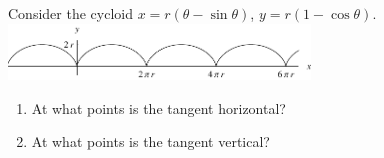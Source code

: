 \begin{frame}[t]
\begin{example} %
Consider the cycloid $x = r(\theta - \sin \theta )$, $y = r(1 - \cos \theta )$.
\ \includegraphics[height=1.5cm]{parametric-curves/pictures/11-02-ex2a.pdf}%
\begin{enumerate}
\item  At what points is the tangent horizontal?
\item  At what points is the tangent vertical?
\end{enumerate}
\end{example}
\end{frame}


